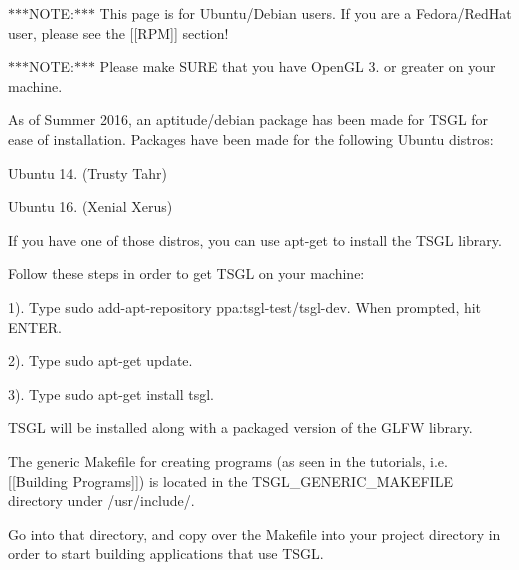 $\ast$$\ast$$\ast$\-N\-O\-T\-E\-:$\ast$$\ast$$\ast$ This page is for Ubuntu/\-Debian users. If you are a Fedora/\-Red\-Hat user, please see the \mbox{[}\mbox{[}R\-P\-M\mbox{]}\mbox{]} section!

$\ast$$\ast$$\ast$\-N\-O\-T\-E\-:$\ast$$\ast$$\ast$ Please make S\-U\-R\-E that you have Open\-G\-L 3. or greater on your machine.

As of Summer 2016, an aptitude/debian package has been made for T\-S\-G\-L for ease of installation. Packages have been made for the following Ubuntu distros\-:
\begin{DoxyItemize}
\item Ubuntu 14. (Trusty Tahr)
\item Ubuntu 16. (Xenial Xerus)
\end{DoxyItemize}

If you have one of those distros, you can use apt-\/get to install the T\-S\-G\-L library.

Follow these steps in order to get T\-S\-G\-L on your machine\-:

1). Type {\ttfamily sudo add-\/apt-\/repository ppa\-:tsgl-\/test/tsgl-\/dev}. When prompted, hit {\ttfamily E\-N\-T\-E\-R}.

2). Type {\ttfamily sudo apt-\/get update}.

3). Type {\ttfamily sudo apt-\/get install tsgl}.

T\-S\-G\-L will be installed along with a packaged version of the G\-L\-F\-W library.

The generic {\ttfamily Makefile} for creating programs (as seen in the tutorials, i.\-e. \mbox{[}\mbox{[}Building Programs\mbox{]}\mbox{]}) is located in the {\ttfamily T\-S\-G\-L\-\_\-\-G\-E\-N\-E\-R\-I\-C\-\_\-\-M\-A\-K\-E\-F\-I\-L\-E} directory under {\ttfamily /usr/include/}.

Go into that directory, and copy over the {\ttfamily Makefile} into your project directory in order to start building applications that use T\-S\-G\-L. 